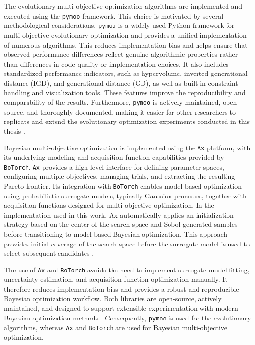 The evolutionary multi-objective optimization algorithms are implemented and executed using the \texttt{pymoo} framework. This choice is motivated by
several methodological considerations. \texttt{pymoo} is a widely used Python framework for multi-objective evolutionary optimization and provides a
unified implementation of numerous algorithms. This reduces implementation bias and helps ensure that observed performance differences reflect genuine
algorithmic properties rather than differences in code quality or implementation choices. It also includes standardized performance indicators, such
as hypervolume, inverted generational distance (IGD), and generational distance (GD), as well as built-in constraint-handling and visualization tools.
These features improve the reproducibility and comparability of the results. Furthermore, \texttt{pymoo} is actively maintained, open-source, and
thoroughly documented, making it easier for other researchers to replicate and extend the evolutionary optimization experiments conducted in this
thesis \cite{pymoo}.

Bayesian multi-objective optimization is implemented using the \texttt{Ax} platform, with its underlying modeling and acquisition-function
capabilities provided by \texttt{BoTorch}. \texttt{Ax} provides a high-level interface for defining parameter spaces, configuring multiple objectives,
managing trials, and extracting the resulting Pareto frontier. Its integration with \texttt{BoTorch} enables model-based optimization using
probabilistic surrogate models, typically Gaussian processes, together with acquisition functions designed for multi-objective optimization. In the
implementation used in this work, Ax automatically applies an initialization strategy based on the center of the search space and Sobol-generated
samples before transitioning to model-based Bayesian optimization. This approach provides initial coverage of the search space before the surrogate
model is used to select subsequent candidates \cite{olson2025ax}.

The use of \texttt{Ax} and \texttt{BoTorch} avoids the need to implement surrogate-model fitting, uncertainty estimation, and acquisition-function
optimization manually. It therefore reduces implementation bias and provides a robust and reproducible Bayesian optimization workflow. Both libraries
are open-source, actively maintained, and designed to support extensible experimentation with modern Bayesian optimization methods \cite{olson2025ax, botorch}.
Consequently, \texttt{pymoo} is used for the evolutionary algorithms, whereas \texttt{Ax} and \texttt{BoTorch} are used for Bayesian multi-objective
optimization.

